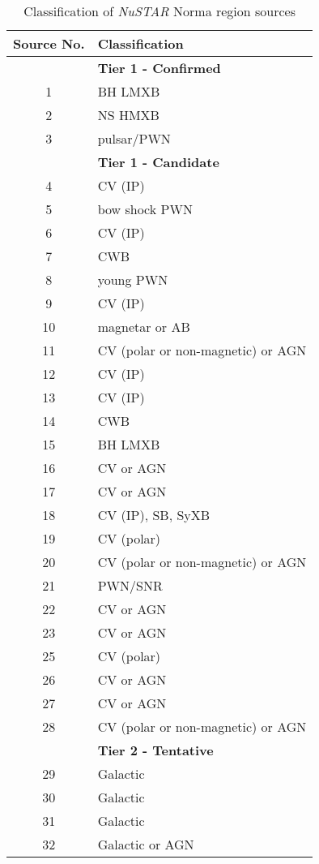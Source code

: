 \documentclass[iop,revtex4]{emulateapj}
\newcommand\T{\rule{0pt}{2.6ex}}       %
\newcommand\B{\rule[-1.2ex]{0pt}{0pt}} %
\begin{document}
\begin{table}
\begin{minipage}{\linewidth}
\begin{adjustwidth}{-0.9in}{-0.9in}
\centering
\footnotesize
\begin{threeparttable}
\caption{Classification of \textit{NuSTAR} Norma region sources}
\begin{tabular}{cl} \hline \hline
\T \B Source No. & Classification \\
\hline
\T &\textbf{Tier 1 - Confirmed}\\
\T 1 & BH LMXB \\
2 & NS HMXB \\
3 & pulsar/PWN \\
\hline
\T &\textbf{Tier 1 - Candidate} \\
4 & CV (IP) \\
5 & bow shock PWN \\
6 & CV (IP) \\
7 & CWB \\
8 & young PWN \\ 
9 & CV (IP) \\
10 & magnetar or AB \\
11 & CV (polar or non-magnetic) or AGN \\
12 & CV (IP) \\
13 & CV (IP) \\
14 & CWB \\
15 & BH LMXB \\
16 & CV or AGN \\
17 & CV or AGN \\
18 & CV (IP), SB, SyXB \\
19 & CV (polar) \\
20 & CV (polar or non-magnetic) or AGN \\
21 & PWN/SNR \\
22 & CV or AGN \\
23 & CV or AGN \\
25 & CV (polar) \\
26 & CV or AGN \\
27 & CV or AGN \\
28 & CV (polar or non-magnetic) or AGN \\
\hline
\T & \textbf{Tier 2 - Tentative} \\
29 & Galactic \\
30 & Galactic \\
31 & Galactic \\
32 & Galactic or AGN \\

\end{tabular}
\end{threeparttable}
\end{adjustwidth}
\end{minipage}
\end{table}
\end{document}

